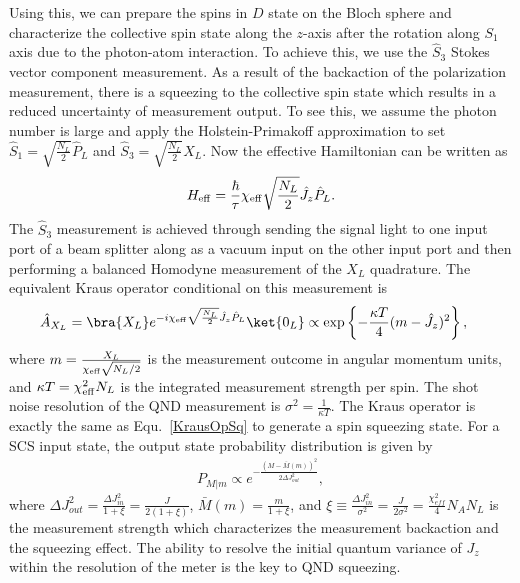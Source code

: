 \documentclass[]{report}
\begin{document}
Using this, we can prepare the spins in $ D $ state on the Bloch sphere and characterize the collective spin state along the $ z $-axis after the rotation along $ S_1 $ axis due to the photon-atom interaction. To achieve this, we use the $ \hat{S}_3 $ Stokes vector component measurement. As a result of the backaction of the polarization measurement, there is a squeezing to the collective spin state which results in a reduced uncertainty of measurement output. To see this, we assume the photon number is large and apply the Holstein-Primakoff approximation to set $ \hat{S}_1=\sqrt{\frac{N_L}{2}}\hat{P}_L $ and $ \hat{S}_3=\sqrt{\frac{N_L}{2}}\hat{X}_L $. Now the effective Hamiltonian can be written as
\begin{align}
H_{\rm eff} = \frac{\hbar}{\tau} \chi_{\rm eff} \sqrt{\frac{N_L}{2}}\hat{J}_z \hat{P}_L. 
\end{align}
The $ \hat{S}_3 $ measurement is achieved through sending the signal light to one input port of a beam splitter along as a vacuum input on the other input port and then performing a balanced Homodyne measurement of the $ X_L $ quadrature. The equivalent Kraus operator conditional on this measurement is 
\begin{align}
\hat{A}_{X_L} &= \bra{X_L} e^{-i\chi_{\rm eff} \sqrt{\frac{N_L}{2}}\hat{J}_z \hat{P}_L} \ket{0_L}\propto \exp\left\{ -\frac{\kappa T}{4}(m-\hat{J}_z)^2 \right\},
\end{align} 
where $ m=\frac{X_L}{\chi_{\rm eff} \sqrt{N_L/2}} $ is the measurement outcome in angular momentum units, and $ \kappa T=\chi_{\rm eff}^2N_L $ is the integrated measurement strength per spin. The shot noise resolution of the QND measurement is $ \sigma^2=\frac{1}{\kappa T} $. The Kraus operator is exactly the same as Equ.~\eqref{KrausOpSq} to generate a spin squeezing
 state. For a SCS input state, the output state probability distribution is given by 
\begin{align}
P_{M|m} \propto e^{-\frac{(M-\bar{M}(m))^2}{2\Delta J_{out}^2}},
\end{align}
where $ \Delta J_{out}^2 =\frac{\Delta J_{in}^2}{1+\xi}=\frac{J}{2(1+\xi)} $, $ \bar{M}(m)=\frac{m}{1+\xi} $, and $ \xi\equiv \frac{\Delta J_{in}^2}{\sigma^2}=\frac{J}{2\sigma^2}=\frac{\chi_{e\!f\!f}^2}{4}N_AN_L $ is the measurement strength which characterizes the measurement backaction and the squeezing effect. The ability to resolve the initial quantum variance of $ J_z $ within the resolution of the meter is the key to QND squeezing. 
\end{document}
